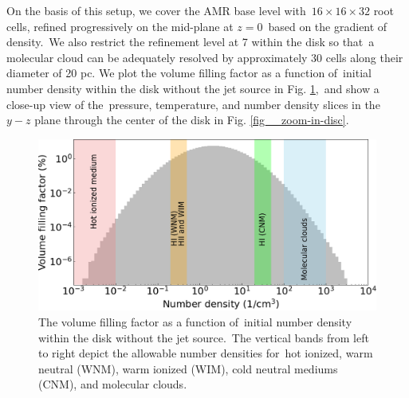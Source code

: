 \documentclass[fleqn,usenatbib,useAMS]{mnras}
\begin{document}
  On the basis of this setup, we cover the AMR base level with\
  $16\times16\times32$ root cells, refined progressively on the mid-plane at $z=0$\
  based on the gradient of density.\
  We also restrict the refinement level at 7 within the disk so that\
  a molecular cloud can be adequately resolved by approximately 30 cells along their diameter of 20 pc. We plot the volume filling factor as a function of\
  initial number density within the disk without the jet source in Fig. \ref{fig__numberDensityHistogram},\
  and show a close-up view of the\
  pressure, temperature, and number density slices
  in the $y-z$ plane through the center of the disk in Fig. \ref{fig__zoom-in-disc}.

  \begin{figure}
      \includegraphics[width=\columnwidth]{figures/fig__numberDensityHistogram.png}
    \caption{The volume filling factor as a function of\
             initial number density within the disk without the jet source.\
             The vertical bands from left to right depict the allowable number densities \citep{peak-ism-density} for\
             hot ionized, warm neutral (WNM), warm ionized (WIM), cold neutral mediums (CNM), and molecular clouds.}
      \label{fig__numberDensityHistogram}
  \end{figure}
\end{document}
